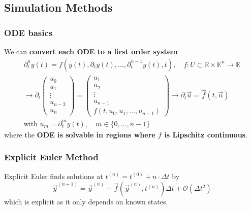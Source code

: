 \subsection*{Simulation Methods}

\subsubsection*{ODE basics}
We can \textbf{convert each ODE to a first order system}
\begin{equation}
    \begin{gathered}
        \partial_t^n y(t) = f\left(y(t), \partial_t y(t), \dots, \partial_t^{n-1} y(t), t\right), \quad f: U \subset \mathbb{R} \times \mathbb{K}^n \to \mathbb{K} \\
        \rightarrow  \partial_t \begin{pmatrix} u_0 \\ u_1 \\ \vdots \\ u_{n-2} \\ u_n \end{pmatrix} = \begin{pmatrix} u_1 \\ u_2 \\ \vdots \\ u_{n-1} \\ f\left(t, u_0, u_1, \dots, u_{n-1}\right) \end{pmatrix} \rightarrow \partial_t \vec{u} = \vec{f}\left(t, \vec{u}\right) \\
        \text{with } u_m = \partial_t^m y(t), \quad m \in \{0, \dots, n-1\}
    \end{gathered}
\end{equation}
where the \textbf{ODE is solvable in regions where $f$ is Lipschitz continuous}.

\subsubsection*{Explicit Euler Method}
Explicit Euler finds solutions at $t^{(n)} = t^{(0)} + n \cdot \Delta t$ by
\begin{equation}
    \vec{y}^{(n+1)} = \vec{y}^{(n)} + \vec{f} \left( \vec{y}^{(n)}, t^{(n)} \right) \Delta t + \mathcal{O}(\Delta t^2)
\end{equation}
which is explicit as it only depends on known states.

